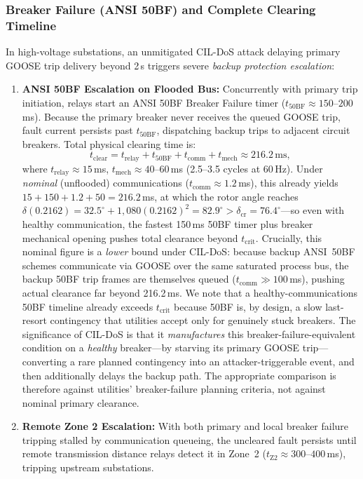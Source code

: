 \documentclass[journal]{IEEEtran}
\begin{document}
\subsubsection{Breaker Failure (ANSI 50BF) and Complete Clearing Timeline}
In high-voltage substations, an unmitigated CIL-DoS attack delaying primary GOOSE trip delivery beyond 2\,s triggers severe \emph{backup protection escalation}:
\begin{enumerate}[leftmargin=*,noitemsep,topsep=1pt]
    \item \textbf{ANSI 50BF Escalation on Flooded Bus:} Concurrently with primary trip initiation, relays start an ANSI 50BF Breaker Failure timer ($t_{\text{50BF}} \approx 150\text{--}200$\,ms). Because the primary breaker never receives the queued GOOSE trip, fault current persists past $t_{\text{50BF}}$, dispatching backup trips to adjacent circuit breakers. Total physical clearing time is:
    \begin{equation}
    t_{\text{clear}} = t_{\text{relay}} + t_{\text{50BF}} + t_{\text{comm}} + t_{\text{mech}} \approx 216.2\,\text{ms},
    \end{equation}
    where $t_{\text{relay}} \approx 15$\,ms, $t_{\text{mech}} \approx 40\text{--}60$\,ms (2.5--3.5 cycles at 60\,Hz). Under \emph{nominal} (unflooded) communications ($t_{\text{comm}} \approx 1.2$\,ms), this already yields $15 + 150 + 1.2 + 50 = 216.2$\,ms, at which the rotor angle reaches $\delta(0.2162) = 32.5^\circ + 1{,}080(0.2162)^2 = 82.9^\circ > \delta_{\text{cr}} = 76.4^\circ$---so even with healthy communication, the fastest 150\,ms 50BF timer plus breaker mechanical opening pushes total clearance beyond $t_{\text{crit}}$. Crucially, this nominal figure is a \emph{lower} bound under CIL-DoS: because backup ANSI~50BF schemes communicate via GOOSE over the same saturated process bus, the backup 50BF trip frames are themselves queued ($t_{\text{comm}} \gg 100$\,ms), pushing actual clearance far beyond 216.2\,ms. We note that a healthy-communications 50BF timeline already exceeds $t_{\text{crit}}$ because 50BF is, by design, a slow last-resort contingency that utilities accept only for genuinely stuck breakers. The significance of CIL-DoS is that it \emph{manufactures} this breaker-failure-equivalent condition on a \emph{healthy} breaker---by starving its primary GOOSE trip---converting a rare planned contingency into an attacker-triggerable event, and then additionally delays the backup path. The appropriate comparison is therefore against utilities' breaker-failure planning criteria, not against nominal primary clearance.
    \item \textbf{Remote Zone 2 Escalation:} With both primary and local breaker failure tripping stalled by communication queueing, the uncleared fault persists until remote transmission distance relays detect it in Zone~2 ($t_{\text{Z2}} \approx 300\text{--}400$\,ms), tripping upstream substations.
\end{enumerate}
\end{document}
